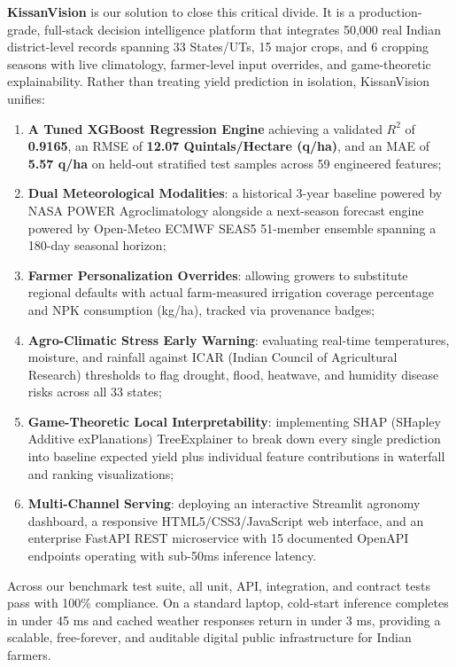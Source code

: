 \documentclass[11pt,a4paper]{report}
\begin{document}
\textbf{KissanVision} is our solution to close this critical divide. It is a production-grade, full-stack decision intelligence platform that integrates 50,000 real Indian district-level records spanning 33 States/UTs, 15 major crops, and 6 cropping seasons with live climatology, farmer-level input overrides, and game-theoretic explainability. Rather than treating yield prediction in isolation, KissanVision unifies:
\begin{enumerate}
  \item \textbf{A Tuned XGBoost Regression Engine} achieving a validated $R^2$ of \textbf{0.9165}, an RMSE of \textbf{12.07 Quintals/Hectare (q/ha)}, and an MAE of \textbf{5.57 q/ha} on held-out stratified test samples across 59 engineered features;
  \item \textbf{Dual Meteorological Modalities}: a historical 3-year baseline powered by NASA POWER Agroclimatology alongside a next-season forecast engine powered by Open-Meteo ECMWF SEAS5 51-member ensemble spanning a 180-day seasonal horizon;
  \item \textbf{Farmer Personalization Overrides}: allowing growers to substitute regional defaults with actual farm-measured irrigation coverage percentage and NPK consumption (kg/ha), tracked via provenance badges;
  \item \textbf{Agro-Climatic Stress Early Warning}: evaluating real-time temperatures, moisture, and rainfall against ICAR (Indian Council of Agricultural Research) thresholds to flag drought, flood, heatwave, and humidity disease risks across all 33 states;
  \item \textbf{Game-Theoretic Local Interpretability}: implementing SHAP (SHapley Additive exPlanations) TreeExplainer to break down every single prediction into baseline expected yield plus individual feature contributions in waterfall and ranking visualizations;
  \item \textbf{Multi-Channel Serving}: deploying an interactive Streamlit agronomy dashboard, a responsive HTML5/CSS3/JavaScript web interface, and an enterprise FastAPI REST microservice with 15 documented OpenAPI endpoints operating with sub-50ms inference latency.
\end{enumerate}

Across our benchmark test suite, all unit, API, integration, and contract tests pass with 100\% compliance. On a standard laptop, cold-start inference completes in under 45 ms and cached weather responses return in under 3 ms, providing a scalable, free-forever, and auditable digital public infrastructure for Indian farmers.\\[8mm]
\end{document}
